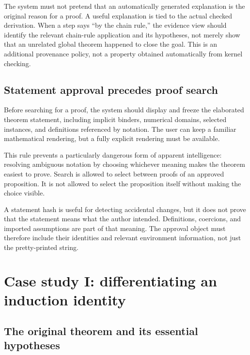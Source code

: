 \documentclass[11pt,letterpaper]{article}
\theoremstyle{remark}
\begin{document}
The system must not pretend that an automatically generated explanation is the original reason for a proof. A useful explanation is tied to the actual checked derivation. When a step says ``by the chain rule,'' the evidence view should identify the relevant chain-rule application and its hypotheses, not merely show that an unrelated global theorem happened to close the goal. This is an additional provenance policy, not a property obtained automatically from kernel checking.

\subsection{Statement approval precedes proof search}

Before searching for a proof, the system should display and freeze the elaborated theorem statement, including implicit binders, numerical domains, selected instances, and definitions referenced by notation. The user can keep a familiar mathematical rendering, but a fully explicit rendering must be available.

This rule prevents a particularly dangerous form of apparent intelligence: resolving ambiguous notation by choosing whichever meaning makes the theorem easiest to prove. Search is allowed to select between proofs of an approved proposition. It is not allowed to select the proposition itself without making the choice visible.

A statement hash is useful for detecting accidental changes, but it does not prove that the statement means what the author intended. Definitions, coercions, and imported assumptions are part of that meaning. The approval object must therefore include their identities and relevant environment information, not just the pretty-printed string.

\section{Case study I: differentiating an induction identity}
\label{sec:derivative}

\subsection{The original theorem and its essential hypotheses}
\end{document}
